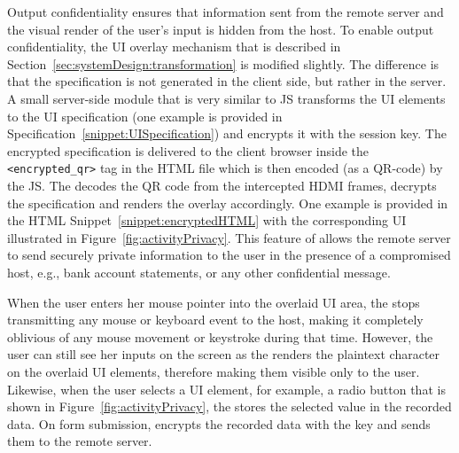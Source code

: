 \parasave
{} Output confidentiality ensures that information sent from the remote server and the visual render of the user's input is hidden from the host. To enable output confidentiality, the UI overlay mechanism that is described in Section~\ref{sec:systemDesign:transformation} is modified slightly. The difference is that the specification is not generated in the client side, but rather in the server.
A small server-side module that is very similar to \name JS transforms the UI elements to the UI specification (one example is provided in Specification~\ref{snippet:UISpecification}) and encrypts it with the \tls session key. 
The encrypted specification is delivered to the client browser inside the \texttt{<encrypted\_qr>} tag in the HTML file which is then encoded (as a QR-code) by the \name JS. The \device decodes the QR code from the intercepted HDMI frames, decrypts the specification and renders the overlay accordingly. One example is provided in the HTML Snippet~\ref{snippet:encryptedHTML} with the corresponding UI illustrated in Figure~\ref{fig:activityPrivacy}. 
This feature of \name allows the remote server to send securely private information to the user in the presence of a compromised host, e.g., bank account statements, or any other confidential message. 

\parasave
{} When the user enters her mouse pointer into the overlaid UI area, the \device stops transmitting any mouse or keyboard event to the host, making it completely oblivious of any mouse movement or keystroke during that time. 
However, the user can still see her inputs on the screen as the \device renders the plaintext character on the overlaid UI elements, therefore making them visible only to the user.
Likewise, when the user selects a UI element, for example, a radio button that is shown in Figure~\ref{fig:activityPrivacy}, the \device stores the selected value in the recorded data.
On form submission, \device encrypts the recorded data with the \tls key and sends them to the remote server.


